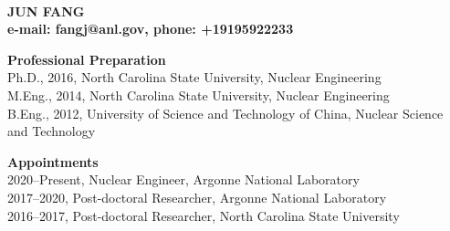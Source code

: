 \documentclass[11pt,letterpaper,english]{article}
\begin{document}
\setlength{\parindent}{0in} %

\pagestyle{fancy}   \renewcommand{%
\headrulewidth}{0.0pt}

\\
{\bf JUN FANG}\\
{\bf e-mail: fangj@anl.gov, phone: +19195922233} \smallskip

\begin{flushleft} {\bf Professional Preparation}
{\parindent 16pt
   ~\\
   Ph.D.,  2016, North Carolina State University, Nuclear Engineering \\
   M.Eng., 2014, North Carolina State University, Nuclear Engineering \\
   B.Eng., 2012, University of Science and Technology of China, Nuclear Science and Technology \\
}

\vspace{.04in}
{\bf Appointments}
{\parindent 16pt
  ~\\
  2020--Present, Nuclear Engineer, Argonne National Laboratory \\
  2017--2020, Post-doctoral Researcher, Argonne National Laboratory\\
  2016--2017, Post-doctoral Researcher, North Carolina State University\\
}


\end{flushleft}
\end{document}
